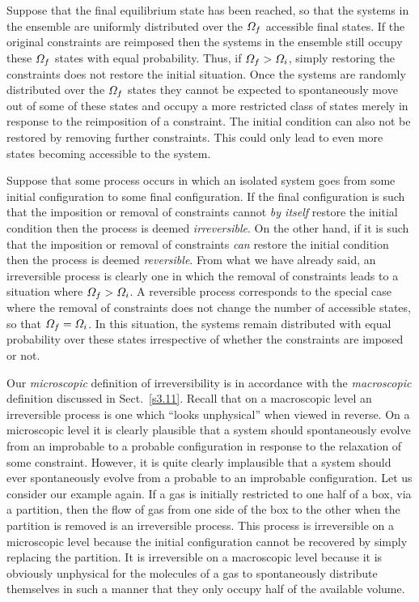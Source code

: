 Suppose that the final equilibrium state has been reached, so that the systems in the
ensemble are uniformly distributed over the ${\mit\Omega}_f$ accessible final states.
If the original constraints are reimposed then the systems 
in the ensemble  still
occupy these ${\mit\Omega}_f$ states with equal probability. Thus, if ${\mit\Omega}_f >
{\mit\Omega}_i$, simply restoring the constraints does not restore the initial situation.
Once the systems are randomly distributed over the ${\mit\Omega}_f$ states they cannot
be expected to spontaneously move out of some of these states and occupy a
more restricted class of states merely in 
response to the reimposition of a constraint.
The initial condition can also not be restored by removing further constraints. This
could only lead to even more states becoming accessible to the system. 

Suppose that some process occurs in which an isolated  system
goes from some initial configuration to some final configuration. If the
final configuration is such that the imposition or removal of constraints
 cannot {\em by itself}\/ restore the initial condition then
the process is deemed {\em irreversible}. On the other hand, if it is such that the 
imposition or removal of constraints {\em can}\/ restore the initial condition
 then the
process is deemed {\em reversible}. From what we have already said, an irreversible
process is clearly one in which the removal of constraints leads to a situation
where ${\mit\Omega}_f > {\mit\Omega}_i$. A reversible process corresponds to the special
case where the removal of constraints does not change the number of accessible
states, so that ${\mit\Omega}_f = {\mit\Omega}_i$. In this situation, the systems 
 remain
distributed with equal probability over these states irrespective of whether the
constraints are imposed or not. 

Our {\em microscopic}\/ definition of irreversibility is in accordance with the
{\em macroscopic}\/ definition discussed in Sect.~\ref{s3.11}. Recall that on a
macroscopic level an irreversible process is one which ``looks unphysical''
when viewed in reverse. On a microscopic level it is clearly plausible that a
system should spontaneously evolve from an improbable to a probable configuration 
in response to the relaxation of some constraint. However, it is quite clearly
 implausible that a system should ever spontaneously evolve from a probable
to an improbable configuration. Let us consider our example again. 
If a gas is initially
restricted to one half of a box, via a partition, then the flow of gas
from one side  of the box to the other when the partition is removed is an
irreversible process. This process is irreversible on a microscopic level because the
initial configuration  cannot be  recovered by simply replacing the partition. 
It is irreversible on a macroscopic level because  it is obviously
unphysical for the molecules of a gas to spontaneously distribute themselves 
in such a manner  that
they only occupy half of the available volume.

